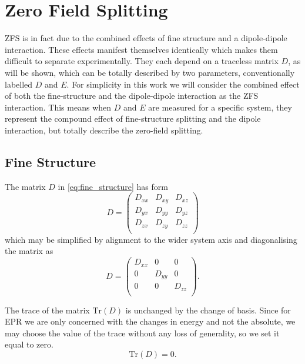 \section{Zero Field Splitting}
ZFS is in fact due to the combined effects of fine structure and a dipole-dipole interaction. These effects manifest themselves identically which makes them difficult to separate experimentally. They each depend on a traceless matrix $D$, as will be shown, which can be totally described by two parameters, conventionally labelled $D$ and $E$. 
For simplicity in this work we will consider the combined effect of both the fine-structure and the dipole-dipole interaction as the ZFS interaction. This means when $D$ and $E$ are measured for a specific system, they represent the compound effect of fine-structure splitting and the dipole interaction, but totally describe the zero-field splitting. 

\subsection{Fine Structure}
The matrix $D$ in \ref{eq:fine_structure} has form 
\begin{equation}
   D = \begin{pmatrix}
       D_{xx} & D_{xy} & D_{xz} \\ 
       D_{yx} & D_{yy} & D_{yz} \\ 
       D_{zx} & D_{zy} & D_{zz} \\ 
   \end{pmatrix} 
\end{equation}
which may be simplified by alignment to the wider system axis and diagonalising the matrix as 
\begin{equation}
   D = \begin{pmatrix}
       D_{xx} & 0 & 0 \\ 
       0 & D_{yy} & 0 \\ 
       0 & 0 & D_{zz} \\ 
   \end{pmatrix}.
    \label{eq:fine_splitting_D}
\end{equation}

The trace of the matrix $\text{Tr}(D)$ is unchanged by the change of basis. Since for EPR we are only concerned with the changes in energy and not the absolute, we may choose the value of the trace without any loss of generality, so we set it equal to zero. 
\begin{equation}
    \text{Tr}(D) = 0. 
\end{equation}

